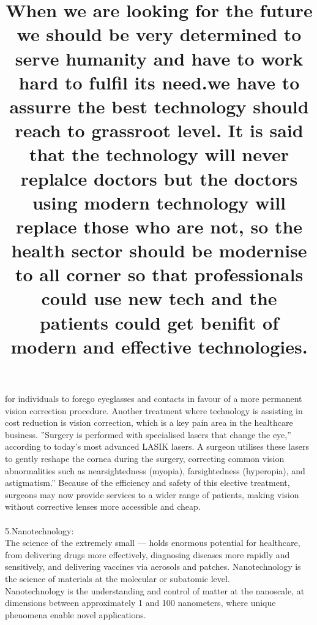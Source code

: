 \documentclass[a4paper,12pt]{article}
\begin{document}
	for individuals to forego eyeglasses and contacts in favour of a more permanent
	vision correction procedure. Another treatment where technology is assisting in cost
	reduction is vision correction, which is a key pain area in the healthcare business.
	”Surgery is performed with specialised lasers that change the eye,” according to today’s most advanced LASIK lasers. A surgeon utilises these lasers to gently reshape
	the cornea during the surgery, correcting common vision abnormalities such as nearsightedness (myopia), farsightedness (hyperopia), and astigmatism.” Because of the
	efficiency and safety of this elective treatment, surgeons may now provide services
	to a wider range of patients, making vision without corrective lenses more accessible
	and cheap.
	\\
	\\
	5.Nanotechnology:
	\\
	The science of the extremely small — holds enormous potential
	for healthcare, from delivering drugs more effectively,
	diagnosing diseases more rapidly and sensitively, and delivering
	vaccines via aerosols and patches. Nanotechnology is the
	science of materials at the molecular or subatomic level.
	\\
	Nanotechnology is the understanding and control of matter at
	the nanoscale, at dimensions between approximately 1 and 100
	nanometers, where unique phenomena enable novel
	applications.
	\\
	\newpage
	{\Huge \title {When we are looking for the future we should be very determined to serve humanity and
	have to work hard to fulfil its need.we have to assurre the best technology should reach to grassroot level.
	It is said that the technology will never replalce doctors but the doctors using modern technology will replace those who are not, so the health sector should be modernise to all corner so that professionals could use new tech and the patients could get benifit of modern and effective technologies.}}
	
	
\end{document}
